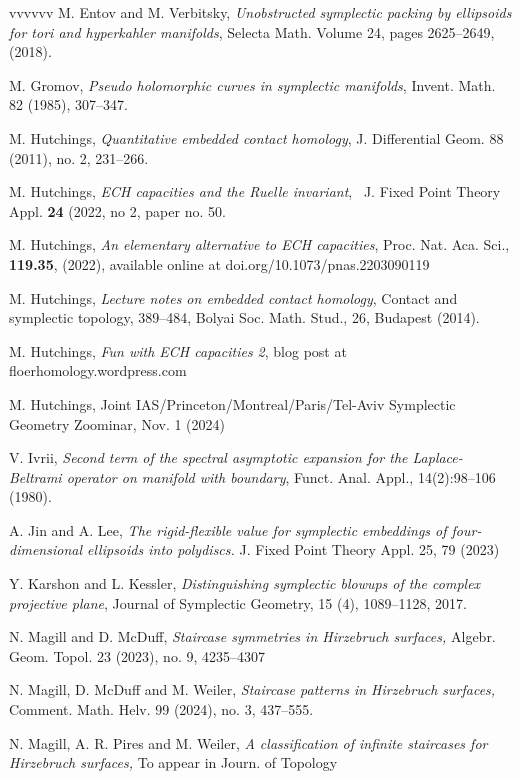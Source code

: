 \documentclass[11pt, reqno]{amsart}
\theoremstyle{remark}
\numberwithin{equation}{subsection}
\numberwithin{figure}{section}
\theoremstyle{customremark}
\begin{document}
\begin{thebibliography}{vvvvvv}
 M. Entov and M. Verbitsky, {\it Unobstructed symplectic packing by ellipsoids for tori and hyperkahler manifolds}, Selecta Math. Volume 24, pages 2625–2649, (2018).

 M. Gromov,  {\it Pseudo holomorphic curves in symplectic manifolds}, Invent. Math. 82 (1985),
307–347.

 M.  Hutchings,
{\it Quantitative embedded contact homology},
J. Differential Geom. 88 (2011), no. 2, 231–266.

 M. Hutchings, {\it ECH capacities and the Ruelle invariant}, {\ J. Fixed Point Theory Appl.} {\bf 24} (2022, no 2, paper no. 50.

 M. Hutchings, {\it An elementary alternative to ECH capacities}, Proc. Nat. Aca. Sci., {\bf 119.35}, (2022), available online at doi.org/10.1073/pnas.2203090119

 M. Hutchings, {\em Lecture notes on embedded contact homology}, Contact and symplectic topology, 389–484,
Bolyai Soc. Math. Stud., 26, Budapest (2014).

 M. Hutchings, {\em Fun with ECH capacities 2}, blog post at floerhomology.wordpress.com

 M. Hutchings, Joint IAS/Princeton/Montreal/Paris/Tel-Aviv Symplectic Geometry Zoominar, Nov. 1 (2024) 

 V. Ivrii, {\em Second term of the spectral asymptotic expansion for the
Laplace-Beltrami operator on manifold with boundary}, Funct. Anal. Appl., 14(2):98–106 (1980).

 A. Jin and A. Lee,  {\it The rigid-flexible value for symplectic embeddings of four-dimensional ellipsoids
into polydiscs.} J. Fixed Point Theory Appl. 25, 79 (2023)

 Y. Karshon and L. Kessler, {\it Distinguishing symplectic blowups of the complex projective plane}, { Journal of Symplectic Geometry}, 15 (4), 1089--1128, 2017. 

 N. Magill and  D. McDuff, {\it Staircase symmetries  in Hirzebruch surfaces, }
Algebr. Geom. Topol. 23 (2023), no. 9, 4235–4307

 N. Magill,  D. McDuff and M. Weiler, {\it Staircase patterns  in Hirzebruch surfaces, }
Comment. Math. Helv. 99 (2024), no. 3, 437–555.

 N. Magill,  A. R. Pires and M. Weiler, {\it A classification of infinite staircases for Hirzebruch surfaces, }
To appear in {Journ. of Topology} 


\end{thebibliography}
\end{document}
